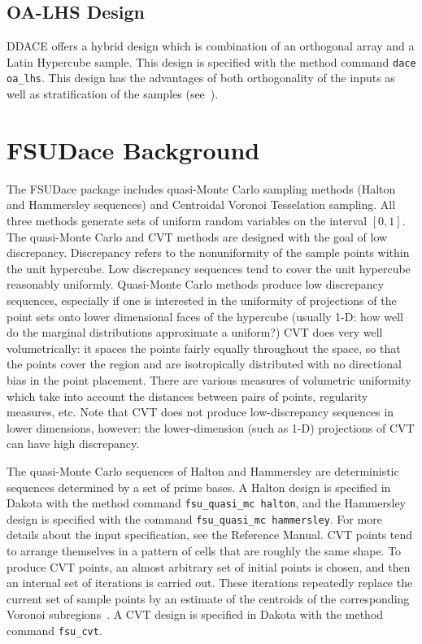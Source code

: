 \subsection{OA-LHS Design}\label{dace:oalhs}

DDACE offers a hybrid design which is combination of an orthogonal
array and a Latin Hypercube sample.  This design is specified with the
method command \texttt{dace oa\_lhs}.  This design has the advantages
of both orthogonality of the inputs as well as stratification of the
samples (see~\cite{Owe92}).

\section{FSUDace Background}\label{dace:fsudace}

The FSUDace package includes quasi-Monte Carlo sampling methods
(Halton and Hammersley sequences) and Centroidal Voronoi Tesselation
sampling.  All three methods generate sets of uniform random variables
on the interval $[0,1]$.  The quasi-Monte Carlo and CVT methods are
designed with the goal of low discrepancy. Discrepancy refers to the
nonuniformity of the sample points within the unit hypercube. Low
discrepancy sequences tend to cover the unit hypercube reasonably
uniformly. Quasi-Monte Carlo methods produce low discrepancy
sequences, especially if one is interested in the uniformity of
projections of the point sets onto lower dimensional faces of the
hypercube (usually 1-D: how well do the marginal distributions
approximate a uniform?) CVT does very well volumetrically: it spaces
the points fairly equally throughout the space, so that the points
cover the region and are isotropically distributed with no directional
bias in the point placement. There are various measures of volumetric
uniformity which take into account the distances between pairs of
points, regularity measures, etc. Note that CVT does not produce
low-discrepancy sequences in lower dimensions, however: the
lower-dimension (such as 1-D) projections of CVT can have high
discrepancy.

The quasi-Monte Carlo sequences of Halton and Hammersley are
deterministic sequences determined by a set of prime bases.
A Halton design is specified in Dakota with the method command 
\texttt{fsu\_quasi\_mc halton}, and the Hammersley design is 
specified with the command \texttt{fsu\_quasi\_mc hammersley}.
For more details about the input specification, see the Reference Manual.
CVT points tend to arrange themselves in a pattern
of cells that are roughly the same shape. To produce CVT
points, an almost arbitrary set of initial points is chosen, and then
an internal set of iterations is carried out. These iterations
repeatedly replace the current set of sample points by an estimate of
the centroids of the corresponding Voronoi subregions~\cite{Du99}.
A CVT design is specified in Dakota with the method command
\texttt{fsu\_cvt}.


